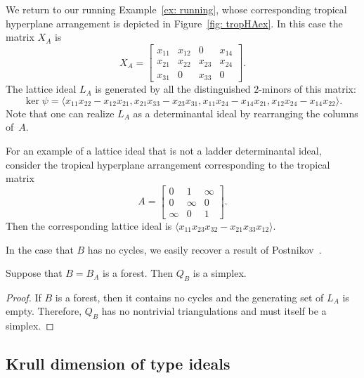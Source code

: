 \begin{example}\label{ex: latticeIdealLadder}
We return to our running Example~\ref{ex: running}, whose corresponding tropical hyperplane arrangement is depicted in Figure~\ref{fig: tropHAex}. In this case the matrix $X_A$ is
\[X_A = \begin{bmatrix} x_{11} & x_{12} & 0 & x_{14}\\ x_{21} & x_{22} & x_{23} & x_{24} \\ x_{31} & 0 & x_{33} & 0 \end{bmatrix}.\]
The lattice ideal $L_A$ is generated by all the distinguished $2$-minors of this matrix:
$$
\ker\psi = \langle x_{11} x_{22} - x_{12} x_{21}, x_{21} x_{33} - x_{23} x_{31}, x_{11} x_{24} - x_{14} x_{21}, x_{12}x_{24} - x_{14}x_{22} \rangle.$$
Note that one can realize $L_A$ as a determinantal ideal by rearranging the columns of~$A$.
\end{example}

\begin{example}\label{ex: latticeIdealNonLadder}
For an example of a lattice ideal that is not a ladder determinantal ideal, consider the tropical hyperplane arrangement corresponding to the tropical matrix
\[A = \begin{bmatrix} 0 & 1 & \infty \\ 0 & \infty & 0 \\ \infty & 0 & 1 \end{bmatrix}.\]
Then the corresponding lattice ideal is
$
\langle x_{11} x_{23} x_{32} - x_{21} x_{33} x_{12}\rangle .
$
\end{example}

In the case that $B$ has no cycles, we easily recover a result of Postnikov~\cite[Lemma~12.5]{postnikov2009permutohedra}.

\begin{cor} Suppose that $B = B_A$ is a forest. Then $Q_B$ is a simplex.
\end{cor}

\begin{proof}
If $B$ is a forest, then it contains no cycles and the generating set of $L_A$ is empty. Therefore, $Q_B$ has no nontrivial triangulations and must itself be a simplex.
\end{proof}


\subsection{Krull dimension of type ideals} \label{sec: Krull}

